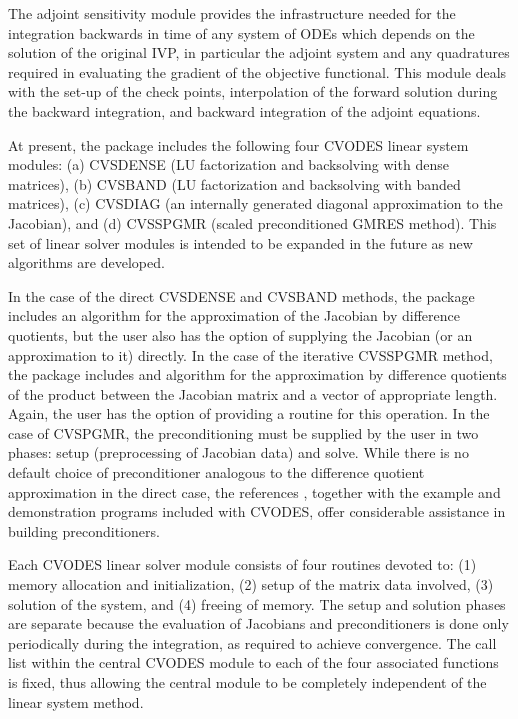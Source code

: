 The adjoint sensitivity module provides the infrastructure needed for the 
integration backwards in time of any system of ODEs which depends on the solution 
of the original IVP, in particular the adjoint system and any quadratures required
in evaluating the gradient of the objective functional.
This module deals with the set-up of the check points, interpolation of the forward 
solution during the backward integration, and backward integration of the adjoint
equations. 

At present, the package includes the following four CVODES linear system
modules:
(a) CVSDENSE (LU factorization and backsolving with dense matrices),
(b) CVSBAND (LU factorization and backsolving with banded matrices),
(c) CVSDIAG (an internally generated diagonal approximation to the 
Jacobian), and
(d) CVSSPGMR (scaled preconditioned GMRES method).
This set of linear solver modules is intended to be expanded in the
future as new algorithms are developed.

In the case of the direct CVSDENSE and CVSBAND methods, the package includes
an algorithm for the approximation of the Jacobian by difference
quotients, but the user also has the option of supplying the Jacobian
(or an approximation to it) directly. In the case of the iterative
CVSSPGMR method, the package includes and algorithm for the approximation
by difference quotients of the product between the Jacobian matrix and
a vector of appropriate length. Again, the user has the option of providing
a routine for this operation.
In the case of CVSPGMR, the preconditioning must be supplied by the user 
in two phases: setup (preprocessing of Jacobian data) and solve.
While there is no default choice of preconditioner analogous to the 
difference quotient approximation in the direct case, the references
\cite{BrHi:89,Byr:92}, together with
the example and demonstration programs included with CVODES, offer
considerable assistance in building preconditioners.

Each CVODES linear solver module consists of four routines devoted to: (1)
memory allocation and initialization, (2) setup of the matrix data
involved, (3) solution of the system, and (4) freeing of memory.  The
setup and solution phases are separate because the evaluation of
Jacobians and preconditioners is done only periodically during the
integration, as required to achieve convergence. The call list within
the central CVODES module to each of the four associated functions is
fixed, thus allowing the central module to be completely independent
of the linear system method.

